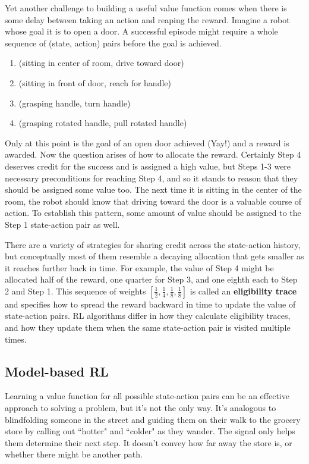 Yet another challenge to building a useful value function comes when there
is some delay between taking an action and reaping the reward. Imagine a
robot whose goal it is to open a door. A successful episode might require a
whole sequence of (state, action) pairs before the goal is achieved.
\begin{enumerate}
  \item{(sitting in center of room, drive toward door)}
  \item{(sitting in front of door, reach for handle)}
  \item{(grasping handle, turn handle)}
  \item{(grasping rotated handle, pull rotated handle)}
\end{enumerate}
Only at this point is the goal of an open door achieved (Yay!) and a reward
is awarded. Now the question arises of how to allocate the reward.
Certainly Step 4 deserves credit for the success and is assigned a high value,
but Steps 1-3 were necessary preconditions for reaching Step 4, and so
it stands to reason that they should be assigned some value too.
The next time it is sitting in the center of the room, the robot should
know that driving toward the door is a valuable course of action.
To establish this pattern, some amount of value should be assigned to
the Step 1 state-action pair as well.

There are a variety of strategies for sharing credit across the
state-action history, but conceptually most of them resemble a
decaying allocation that gets smaller as it reaches further back in time.
For example, the value of Step 4 might be allocated half of the reward,
one quarter for Step 3, and one eighth each to Step 2 and Step 1.
This sequence of weights
$[\frac{1}{2},\frac{1}{4},\frac{1}{8}, \frac{1}{8}]$ is called an
\textbf{eligibility trace} and specifies how to spread the reward
backward in time to update the value of state-action pairs.
RL algorithms differ in how they calculate eligibility traces, and how
they update them when the same state-action pair is visited multiple times.

\subsection{Model-based RL}
\label{subsec:intromodelbased}

Learning a value function for all possible state-action pairs can be an
effective approach to solving a problem, but it's not the only way.
It's analogous to blindfolding someone in the street and guiding them on
their walk to the grocery store by calling out ``hotter" and ``colder" as
they wander. The signal only helps them determine their next step.
It doesn't convey how far away the store is, or whether there might
be another path.

